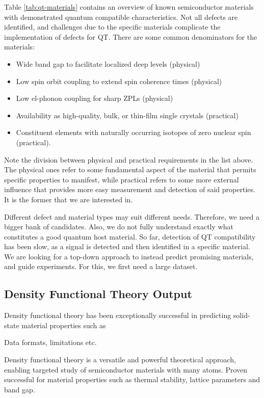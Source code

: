 \documentclass[superscriptaddress,unsortedaddress,
 amsmath,amssymb,
 aps,
]{revtex4-2}
\begin{document}
Table \ref{tab:qt-materials} contains an overview of known semiconductor materials with demonstrated quantum compatible characteristics. 
Not all defects are identified, and challenges due 
to the specific materials complicate the implementation of defects for QT. 
There are some common denominators for the materials: 
\begin{itemize}
    \item Wide band gap to facilitate localized deep levels (physical)
    \item Low spin orbit coupling to extend spin coherence times (physical) 
    \item Low el-phonon coupling for sharp ZPLs (physical) 
    \item Availability as high-quality, bulk, or thin-film single crystals (practical)
    \item Constituent elements with naturally occurring isotopes of zero nuclear spin (practical). 
\end{itemize}
Note the division between physical and practical requirements in the list above. 
The physical ones refer to some fundamental aspect of the material that permits specific properties to manifest, while practical refers to some more external influence that provides more easy measurement and detection of said properties. 
It is the former that we are interested in. 

Different defect and material types may suit different needs. 
Therefore, we need a bigger bank of candidates. 
Also, we do not fully understand exactly what constitutes a good quantum host material. 
So far, detection of QT compatibility has been slow, as a signal is detected and then identified in a specific material. 
We are looking for a top-down approach to instead predict promising materials, and guide experiments. 
For this, we first need a large dataset. 

\subsection*{Density Functional Theory Output} %
Density functional theory has been exceptionally successful in predicting solid-state material properties 
such as 

Data formats, limitations etc.  

Density functional theory is a versatile and powerful theoretical approach, enabling targeted study of semiconductor materials with many atoms. 
Proven successful for material properties such as thermal stability, lattice parameters and band gap. 
\end{document}

